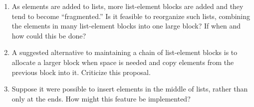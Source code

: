 \begin{enumerate}
\begin{enumerate}
\item As elements are added to lists, more list-element blocks are
added and they tend to become ``fragmented.'' Is it feasible to
reorganize such lists, combining the elements in many list-element
blocks into one large block? If when and how could this be done?

\item A suggested alternative to maintaining a chain of list-element
blocks is to allocate a larger block when space is needed and copy
elements from the previous block into it. Criticize this proposal.

\item Suppose it were possible to insert elements in the middle of
lists, rather than only at the ends. How might this feature be
implemented?

\end{enumerate}
\end{enumerate}
